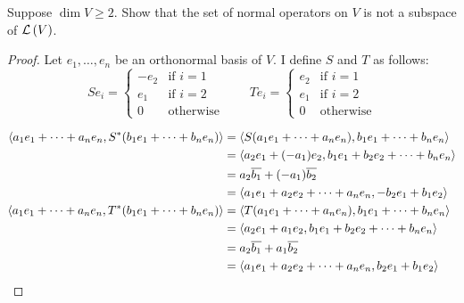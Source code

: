 \begin{exercise}
    Suppose $\dim V\geq 2$. Show that the set of normal operators on $V$ is not a subspace of $\mathcal{L}\left({V}\right)$.
\end{exercise}

\begin{proof}
    Let $e_{1}, \ldots, e_{n}$ be an orthonormal basis of $V$. I define $S$ and $T$ as follows:
    \[
        Se_{i} = \begin{cases}
            -e_{2} & \text{if $i = 1$} \\
            e_{1}  & \text{if $i = 2$} \\
            0      & \text{otherwise}
        \end{cases}\qquad
        Te_{i} = \begin{cases}
            e_{2} & \text{if $i = 1$} \\
            e_{1} & \text{if $i = 2$} \\
            0     & \text{otherwise}
        \end{cases}
    \]

    \begin{align*}
        \left\langle{a_{1}e_{1} + \cdots + a_{n}e_{n}, S^{*}(b_{1}e_{1} + \cdots + b_{n}e_{n})}\right\rangle & = \left\langle{S(a_{1}e_{1} + \cdots + a_{n}e_{n}), b_{1}e_{1} + \cdots + b_{n}e_{n}}\right\rangle     \\
                                                                                              & = \left\langle{a_{2}e_{1} + (-a_{1})e_{2}, b_{1}e_{1} + b_{2}e_{2} + \cdots + b_{n}e_{n}}\right\rangle \\
                                                                                              & = a_{2}\overline{b_{1}} + (-a_{1})\overline{b_{2}}                                              \\
                                                                                              & = \left\langle{a_{1}e_{1} + a_{2}e_{2} + \cdots + a_{n}e_{n}, -b_{2}e_{1} + b_{1}e_{2}}\right\rangle   \\
        \left\langle{a_{1}e_{1} + \cdots + a_{n}e_{n}, T^{*}(b_{1}e_{1} + \cdots + b_{n}e_{n})}\right\rangle & = \left\langle{T(a_{1}e_{1} + \cdots + a_{n}e_{n}), b_{1}e_{1} + \cdots + b_{n}e_{n}}\right\rangle     \\
                                                                                              & = \left\langle{a_{2}e_{1} + a_{1}e_{2}, b_{1}e_{1} + b_{2}e_{2} + \cdots + b_{n}e_{n}}\right\rangle    \\
                                                                                              & = a_{2}\overline{b_{1}} + a_{1}\overline{b_{2}}                                                 \\
                                                                                              & = \left\langle{a_{1}e_{1} + a_{2}e_{2} + \cdots + a_{n}e_{n}, b_{2}e_{1} + b_{1}e_{2}}\right\rangle
    \end{align*}


\end{proof}
